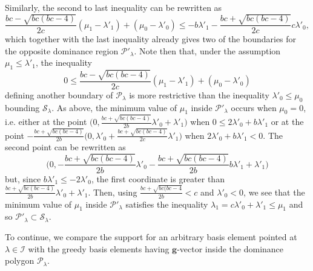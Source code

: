 \documentclass{amsart}
\numberwithin{theorem}{section}
\newcommand{\bfg}{\boldsymbol{g}}
\newcommand{\cI}{\mathcal{I}}
\newcommand{\cP}{\mathcal{P}}
\newcommand{\cS}{\mathcal{S}}
\begin{document}
  Similarly, the second to last inequality can be rewritten as
  \[ \frac{b c-\sqrt{b c (b c-4)}}{2 c}(\mu_1-\lambda'_1)+(\mu_0-\lambda'_0) \leq -b\lambda'_1-\frac{b c+\sqrt{b c (b c-4)}}{2c}c\lambda'_0,\]
  which together with the last inequality already gives two of the boundaries for the opposite dominance region $\cP'_\lambda$.
  Note then that, under the assumption $\mu_1\leq\lambda'_1$, the inequality
  \[ 0 \leq \frac{b c-\sqrt{b c (b c-4)}}{2 c}(\mu_1-\lambda'_1)+(\mu_0-\lambda'_0) \]
  defining another boundary of $\cP_\lambda$ is more restrictive than the inequality $\lambda'_0\leq\mu_0$ bounding $\cS_\lambda$.
  As above, the minimum value of $\mu_1$ inside $\cP'_\lambda$ occurs when $\mu_0=0$, i.e. either at the point $\big(0, \frac{bc+\sqrt{bc(bc-4)}}{2b}\lambda'_0+\lambda'_1 \big)$
  when $0 \leq 2\lambda'_0+b\lambda'_1$ or at the point $-\frac{bc+\sqrt{bc(bc-4)}}{2b} \big(0, \lambda'_0+\frac{bc+\sqrt{bc(bc-4)}}{2c}\lambda'_1 \big)$
  when $2\lambda'_0+b\lambda'_1<0$.
  The second point can be rewritten as
  \[\big(0, -\frac{bc+\sqrt{bc(bc-4)}}{2b} \lambda'_0-\frac{bc+\sqrt{bc(bc-4)}}{2b} b\lambda'_1+\lambda'_1 \big)\]
  but, since $b\lambda'_1\le -2\lambda'_0$, the first coordinate is greater than $\frac{bc+\sqrt{bc(bc-4)}}{2b}\lambda'_0+\lambda'_1$.
  Then, using $\frac{bc+\sqrt{bc(bc-4}}{2b}<c$ and $\lambda'_0<0$, we see that the minimum value of $\mu_1$ inside $\cP'_\lambda$ satisfies the inequality $\lambda_1=c\lambda'_0+\lambda'_1\le\mu_1$ and so $\cP'_\lambda\subset\cS_\lambda$.

  To continue, we compare the support for an arbitrary basis element pointed at $\lambda\in\cI$ with the greedy basis elements having $\bfg$-vector inside the dominance polygon $\cP_\lambda$.
\end{document}
